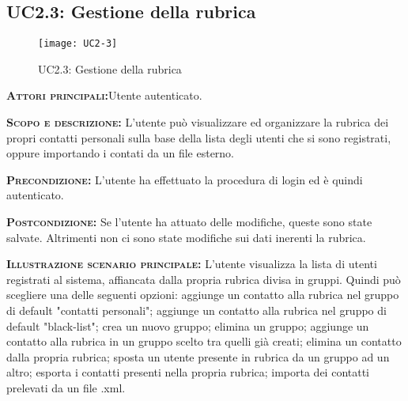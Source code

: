 \subsection{UC2.3: Gestione della rubrica}
\begin{figure}[h!]
\centering
\texttt{[image: UC2-3]}
\caption{UC2.3: Gestione della rubrica}\label{UC2.3}
\end{figure}
\begin{description}
\item{\scshape\bfseries Attori principali:}Utente autenticato.
\item{\scshape\bfseries Scopo e descrizione:} L'utente può visualizzare ed organizzare la rubrica dei propri contatti personali sulla base della lista degli utenti che si sono registrati, oppure importando i contati da un file esterno.
\item{\scshape\bfseries Precondizione:} L'utente ha effettuato la procedura di login ed è quindi autenticato.
\item{\scshape\bfseries Postcondizione:} Se l'utente ha attuato delle modifiche, queste sono state salvate. Altrimenti non ci sono state modifiche sui dati inerenti la rubrica.
\item{\scshape\bfseries Illustrazione scenario principale:} L'utente visualizza la lista di utenti registrati al sistema, affiancata dalla propria rubrica divisa in gruppi. Quindi può scegliere una delle seguenti opzioni: aggiunge un contatto alla rubrica nel gruppo di default "contatti personali"; aggiunge un contatto alla rubrica nel gruppo di default "black-list"; crea un nuovo gruppo; elimina un gruppo; aggiunge un contatto alla rubrica in un gruppo scelto tra quelli già creati; elimina un contatto dalla propria rubrica;  sposta un utente presente in rubrica da un gruppo ad un altro; esporta i contatti presenti nella propria rubrica; importa dei contatti prelevati da un file .xml.
\end{description}

